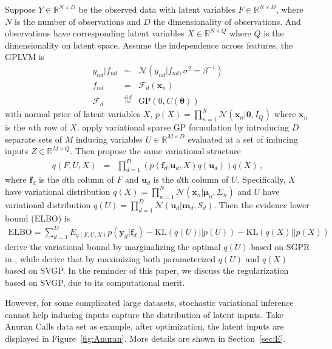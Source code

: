 \documentclass{article}
\begin{document}
Suppose $Y \in \mathbb{R}^{N\times D}$ be the observed data with latent variables $F \in \mathbb{R}^{N\times D}$, where $N$ is the number of observations and $D$ the dimensionality of observations. And observations have corresponding latent variables $X \in \mathbb{R}^{N \times Q}$ where $Q$ is the dimensionality on latent space. Assume the independence across features, the GPLVM is 
\begin{eqnarray}
y_{nd}|f_{nd} & \sim & \mathcal{N}(y_{nd}|f_{nd}, \sigma^2 = \beta^{-1}) \nonumber \\
f_{nd} & = & \mathcal{F}_d(\bm x_n) \nonumber \\
\mathcal{F}_d & \stackrel{iid}{\sim} & \mathrm{GP}(0, C(\bm\theta)) 
\label{GPLVM}
\end{eqnarray}
with normal prior of latent variables $X$, $
p(X) = \prod_{n = 1}^{N}\mathcal{N}(\bm x_n|\bm 0, I_Q)$
where $\bm x_n$ is the $n$th row of $X$. \cite{Titsias_2009, Titsias_2010} apply variational sparse GP formulation by introducing $D$ separate sets of $M$ inducing variables $U \in \mathbb{R}^{M\times D}$ evaluated at a set of inducing inputs $Z\in\mathbb{R}^{M\times Q}$. Then \cite{Titsias_2010, Hensman_2013} propose the same variational structure 
\begin{eqnarray}
q(F, U, X) & = & \prod_{d = 1}^D\left(p(\bm f_d| \bm u_d, X) q(\bm u_d)\right) q(X)\,,
\label{GPLVM_VD}
\end{eqnarray}
where $\bm f_d$ is the $d$th column of $F$ and $\bm u_d$ is the $d$th column of $U$. Specifically, $X$ have variational distribution $q(X) = \prod_{n = 1}^N\mathcal{N}(\bm x_n|\bm \mu_n, \Sigma_n)$ and $U$ have variational distribution $q(U) = \prod_{d = 1}^D\mathcal{N}(\bm u_d| \bm m_d, S_d)$. 
Then the evidence lower bound (ELBO) is 
\begin{eqnarray}
\mathrm{ELBO} = \sum_{d = 1}^{D}E_{q(F, U, X)}p(\bm y_d|\bm f_d) - \mathrm{KL}(q(U)||p(U)) - \mathrm{KL}(q(X)||p(X)) 
\end{eqnarray}	
\cite{Titsias_2010} derive the variational bound by marginalizing the optimal $q(U)$ based on SGPR in \cite{Titsias_2009}, while \cite{Hensman_2013} derive that by maximizing both parameterized $q(U)$ and $q(X)$ based on SVGP. In the reminder of this paper, we discuss the regularization based on SVGP, due to its computational merit. 

However, for some complicated large datasets, stochastic variational inference cannot help inducing inputs capture the distribution of latent inputs. Take Anuran Calls data set as example, after optimization, the latent inputs are displayed in Figure~\ref{fig:Anuran}. More details are shown in Section~\ref{sec:E}. 
\end{document}

